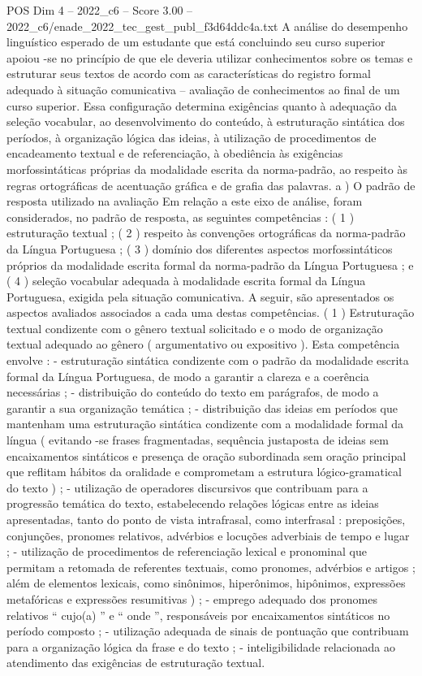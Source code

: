 \begin{textsample}{POS Dim 4 – 2022\_c6 – Score 3.00 – 2022\_c6/enade\_2022\_tec\_gest\_publ\_f3d64ddc4a.txt}
A análise do desempenho linguístico esperado de um estudante que está concluindo seu curso superior apoiou -se no princípio de que ele deveria utilizar conhecimentos sobre os temas e estruturar seus textos de acordo com as características do registro formal adequado à situação comunicativa – avaliação de conhecimentos ao final de um curso superior.
Essa configuração determina exigências quanto à adequação da seleção vocabular, ao desenvolvimento do conteúdo, à estruturação sintática dos períodos, à organização lógica das ideias, à utilização de procedimentos de encadeamento textual e de referenciação, à obediência às exigências morfossintáticas próprias da modalidade escrita da norma-padrão, ao respeito às regras ortográficas de acentuação gráfica e de grafia das palavras. a ) O padrão de resposta utilizado na avaliação Em relação a este eixo de análise, foram considerados, no padrão de resposta, as seguintes competências : ( 1 ) estruturação textual ; ( 2 ) respeito às convenções ortográficas da norma-padrão da Língua Portuguesa ; ( 3 ) domínio dos diferentes aspectos morfossintáticos próprios da modalidade escrita formal da norma-padrão da Língua Portuguesa ; e ( 4 ) seleção vocabular adequada à modalidade escrita formal da Língua Portuguesa, exigida pela situação comunicativa.
A seguir, são apresentados os aspectos avaliados associados a cada uma destas competências. ( 1 ) Estruturação textual condizente com o gênero textual solicitado e o modo de organização textual adequado ao gênero ( argumentativo ou expositivo ).
Esta competência envolve : - estruturação sintática condizente com o padrão da modalidade escrita formal da Língua Portuguesa, de modo a garantir a clareza e a coerência necessárias ; - distribuição do conteúdo do texto em parágrafos, de modo a garantir a sua organização temática ; - distribuição das ideias em períodos que mantenham uma estruturação sintática condizente com a modalidade formal da língua ( evitando -se frases fragmentadas, sequência justaposta de ideias sem encaixamentos sintáticos e presença de oração subordinada sem oração principal que reflitam hábitos da oralidade e comprometam a estrutura lógico-gramatical do texto ) ; - utilização de operadores discursivos que contribuam para a progressão temática do texto, estabelecendo relações lógicas entre as ideias apresentadas, tanto do ponto de vista intrafrasal, como interfrasal : preposições, conjunções, pronomes relativos, advérbios e locuções adverbiais de tempo e lugar ; - utilização de procedimentos de referenciação lexical e pronominal que permitam a retomada de referentes textuais, como pronomes, advérbios e artigos ; além de elementos lexicais, como sinônimos, hiperônimos, hipônimos, expressões metafóricas e expressões resumitivas ) ; - emprego adequado dos pronomes relativos “ cujo(a) ” e “ onde ”, responsáveis por encaixamentos sintáticos no período composto ; - utilização adequada de sinais de pontuação que contribuam para a organização lógica da frase e do texto ; - inteligibilidade relacionada ao atendimento das exigências de estruturação textual.

\end{textsample}
